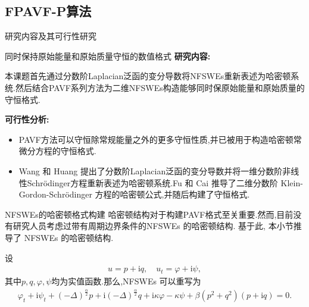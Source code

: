 \documentclass[aspectratio=169]{beamer}
\numberwithin{theorem}{section} %
\begin{document}
\subsection{FPAVF-P算法}
\begin{frame}{研究内容及其可行性研究}
	\begin{block}{同时保持原始能量和原始质量守恒的数值格式}
		\textbf{\textcolor[rgb]{0.227,0.373,0.306}{研究内容:}}
		
		{\footnotesize 本课题首先通过分数阶Laplacian泛函的变分导数将NFSWEs重新表述为哈密顿系统.然后结合PAVF系列方法为二维NFSWEs构造能够同时保原始能量和原始质量的守恒格式.}
		
		\textbf{\textcolor[rgb]{0.227,0.373,0.306}{可行性分析:}}
		\begin{itemize}
			\item {\footnotesize PAVF方法可以守恒除常规能量之外的更多守恒性质,并已被用于构造哈密顿常微分方程的守恒格式\cite{caiPartitionedAveragedVector2018}.​​​​​​​​​​​​​​​​​​​​​​​​​​​​​​​​​​​​​​​​​​​​​​​​​​​​​​​​​​​​​​​​​​​​​​​​​​​​​​​​​​​​​​​​​​​​​​​​​​​​​​​​​​​​​​​​​​​​​​​​​​​​​​​​​​​​​​​​​​​​​​​​​​​​​​​​​​​​​​​​​​​​​​​​​​​​​​​​​​​​​​​​​​​​​​​​​​​​​​​​​​​​​​​​​​​​​​​​​​​​​​​​​​​​​​​​​​​​​​​​​​​​​​​​​​​​​​​​​​​​​​​​​​​​​​​​​​​​​​​​​​​​​​​​​​​​​​​​​​​​​​​​​​​​​​​​​​​​​​​​​​}
			\item {\footnotesize Wang 和 Huang \cite{wangStructurepreservingNumericalMethods2018} 提出了分数阶Laplacian泛函的变分导数并将一维分数阶非线性Schrödinger方程重新表述为哈密顿系统.Fu 和 Cai \cite{fuStructurepreservingAlgorithmsTwodimensional2020} 推导了二维分数阶 Klein-Gordon-Schrödinger 方程的哈密顿公式,并随后构建了守恒格式.}
			\end{itemize}
	\end{block}
	\end{frame}

\begin{frame}{NFSWEs的哈密顿格式构建}
	哈密顿结构对于构建PAVF格式至关重要.然而,目前没有研究人员考虑过带有周期边界条件的NFSWEs  的哈密顿结构.
	基于此, 本小节推导了 NFSWEs 的哈密顿结构.
	
	设
	\begin{align}
	u = p+\mathrm{i}q, \quad u_t = \varphi+ \mathrm{i}\psi,
	\end{align}
	其中$p, q,\varphi,\psi$均为实值函数.那么,NFSWEs  可以重写为
	\begin{align}\label{eq_PAVF:28}
	\varphi_{t}+\mathrm{i}\psi_{t}+\left( -\Delta \right) ^{\frac{\alpha }{2}}p+\mathrm{i}\left( -\Delta \right) ^{\frac{\alpha }{2}}q+\mathrm{i}\kappa \varphi-\kappa \psi+\beta \left( p^{2}+q^{2}\right) \left( p+\mathrm{i} q\right) =0.
	\end{align}
	\end{frame}
\end{document}
